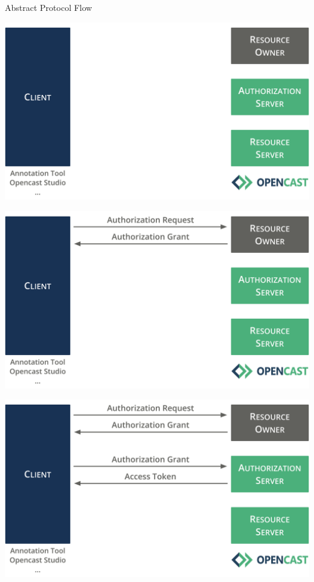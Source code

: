 \documentclass[aspectratio=169]{beamer}
\begin{document}
\begin{frame}{Abstract Protocol Flow}
	\begin{overprint}
		\centerline{\includegraphics[height=0.85\textheight]{figures/abstract-protocol-flow-01}}
		\centerline{\includegraphics[height=0.85\textheight]{figures/abstract-protocol-flow-02}}
		\centerline{\includegraphics[height=0.85\textheight]{figures/abstract-protocol-flow-03}}

\end{overprint}
\end{frame}
\end{document}
